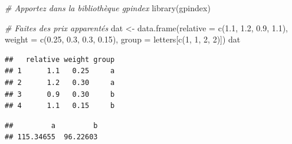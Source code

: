\documentclass[
]{article}
\newenvironment{Shaded}{\begin{snugshade}}{\end{snugshade}}
\newcommand{\AttributeTok}[1]{\textcolor[rgb]{0.77,0.63,0.00}{#1}}
\newcommand{\CommentTok}[1]{\textcolor[rgb]{0.56,0.35,0.01}{\textit{#1}}}
\newcommand{\ControlFlowTok}[1]{\textcolor[rgb]{0.13,0.29,0.53}{\textbf{#1}}}
\newcommand{\DecValTok}[1]{\textcolor[rgb]{0.00,0.00,0.81}{#1}}
\newcommand{\FloatTok}[1]{\textcolor[rgb]{0.00,0.00,0.81}{#1}}
\newcommand{\FunctionTok}[1]{\textcolor[rgb]{0.00,0.00,0.00}{#1}}
\newcommand{\NormalTok}[1]{#1}
\newcommand{\OtherTok}[1]{\textcolor[rgb]{0.56,0.35,0.01}{#1}}
\newcommand{\SpecialCharTok}[1]{\textcolor[rgb]{0.00,0.00,0.00}{#1}}
\begin{document}
\begin{Shaded}
\begin{Highlighting}[]
\CommentTok{\# Apportez dans la bibliothèque gpindex}
\FunctionTok{library}\NormalTok{(gpindex)}

\CommentTok{\# Faites des prix apparentés}
\NormalTok{dat }\OtherTok{\textless{}{-}} \FunctionTok{data.frame}\NormalTok{(}\AttributeTok{relative =} \FunctionTok{c}\NormalTok{(}\FloatTok{1.1}\NormalTok{, }\FloatTok{1.2}\NormalTok{, }\FloatTok{0.9}\NormalTok{, }\FloatTok{1.1}\NormalTok{),}
                  \AttributeTok{weight =} \FunctionTok{c}\NormalTok{(}\FloatTok{0.25}\NormalTok{, }\FloatTok{0.3}\NormalTok{, }\FloatTok{0.3}\NormalTok{, }\FloatTok{0.15}\NormalTok{),}
                  \AttributeTok{group =}\NormalTok{ letters[}\FunctionTok{c}\NormalTok{(}\DecValTok{1}\NormalTok{, }\DecValTok{1}\NormalTok{, }\DecValTok{2}\NormalTok{, }\DecValTok{2}\NormalTok{)])}
\NormalTok{dat}
\end{Highlighting}
\end{Shaded}

\begin{verbatim}
##   relative weight group
## 1      1.1   0.25     a
## 2      1.2   0.30     a
## 3      0.9   0.30     b
## 4      1.1   0.15     b
\end{verbatim}

\begin{Shaded}
\end{Shaded}

\begin{verbatim}
##         a         b 
## 115.34655  96.22603
\end{verbatim}

\begin{Shaded}
\end{Shaded}
\end{document}
